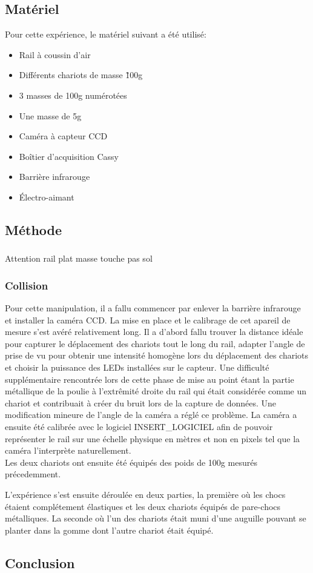 \subsection{Matériel}
Pour cette expérience, le matériel suivant a été utilisé:
\begin{itemize}
    \item Rail à coussin d'air
    \item Différents chariots de masse \~100g
    \item 3 masses de 100g numérotées
    \item Une masse de 5g
    \item Caméra à capteur CCD
    \item Boîtier d'acquisition Cassy
    \item Barrière infrarouge
    \item Électro-aimant
\end{itemize}
\subsection{Méthode}
\subsubsection{}
Attention rail plat
masse touche pas sol

\subsubsection{Collision}
Pour cette manipulation, il a fallu commencer par enlever la barrière infrarouge et installer la caméra CCD.
La mise en place et le calibrage de cet apareil de mesure s'est avéré relativement long. Il a d'abord fallu trouver la distance idéale pour capturer le déplacement des chariots tout le long du rail, adapter l'angle de prise de vu pour obtenir une intensité homogène lors du déplacement des chariots et choisir la puissance des LEDs installées sur le capteur. Une difficulté supplémentaire rencontrée lors de cette phase de mise au point étant la partie métallique de la poulie à l'extrêmité droite du rail qui était considérée comme un chariot et contribuait à créer du bruit lors de la capture de données. Une modification mineure de l'angle de la caméra a réglé ce problème.
La caméra a ensuite été calibrée avec le logiciel INSERT\_LOGICIEL afin de pouvoir représenter le rail sur une échelle physique en mètres et non en pixels tel que la caméra l'interprète naturellement.\\
Les deux chariots ont ensuite été équipés des poids de 100g mesurés précedemment.

L'expérience s'est ensuite déroulée en deux parties, la première où les chocs étaient complétement élastiques et les deux chariots équipés de pare-chocs métalliques. La seconde où l'un des chariots était muni d'une auguille pouvant se planter dans la gomme dont l'autre chariot était équipé.
\subsection{Conclusion}
